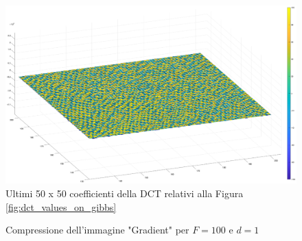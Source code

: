 \begin{figure}
	\centering
	\includegraphics[width=1\linewidth]{figures/last_dct_values.eps}

	\caption{Ultimi 50 x 50 coefficienti della DCT relativi alla Figura \ref{fig:dct_values_on_gibbs}}
	\label{fig:last_dct_values_gibbs}
\end{figure}
\FloatBarrier

\begin{figure}%
	\centering
	\caption{Compressione dell'immagine "Gradient" per $F=100$ e $d=1$}%
	\label{fig:gradient}
\end{figure}

